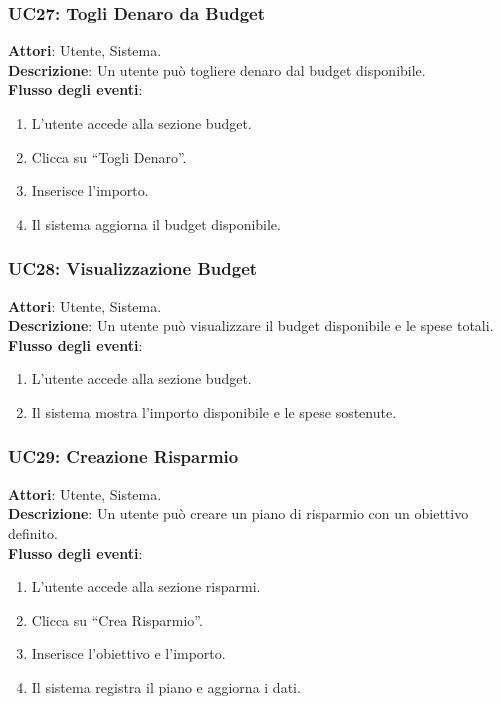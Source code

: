 \subsubsection{UC27: Togli Denaro da Budget}
\textbf{Attori}: Utente, Sistema. \\
\textbf{Descrizione}: Un utente può togliere denaro dal budget disponibile. \\
\textbf{Flusso degli eventi}:
\begin{enumerate}
    \item L’utente accede alla sezione budget.
    \item Clicca su ``Togli Denaro''.
    \item Inserisce l’importo.
    \item Il sistema aggiorna il budget disponibile.
\end{enumerate}

\subsubsection{UC28: Visualizzazione Budget}
\textbf{Attori}: Utente, Sistema. \\
\textbf{Descrizione}: Un utente può visualizzare il budget disponibile e le spese totali. \\
\textbf{Flusso degli eventi}:
\begin{enumerate}
    \item L’utente accede alla sezione budget.
    \item Il sistema mostra l’importo disponibile e le spese sostenute.
\end{enumerate}

\subsubsection{UC29: Creazione Risparmio}
\textbf{Attori}: Utente, Sistema. \\
\textbf{Descrizione}: Un utente può creare un piano di risparmio con un obiettivo definito. \\
\textbf{Flusso degli eventi}:
\begin{enumerate}
    \item L’utente accede alla sezione risparmi.
    \item Clicca su ``Crea Risparmio''.
    \item Inserisce l’obiettivo e l’importo.
    \item Il sistema registra il piano e aggiorna i dati.
\end{enumerate}


